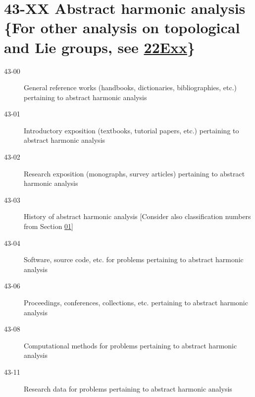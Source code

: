 \section*{43-XX Abstract harmonic analysis \{For other analysis on topological and Lie groups, see \hyperref[22Exx]{22Exx}\} }\label{43-XX}
\begin{description}
\item [43-00]\label{43-00} General reference works (handbooks, dictionaries, bibliographies, etc.) pertaining to abstract harmonic analysis
\item [43-01]\label{43-01} Introductory exposition (textbooks, tutorial papers, etc.) pertaining to abstract harmonic analysis
\item [43-02]\label{43-02} Research exposition (monographs, survey articles) pertaining to abstract harmonic analysis
\item [43-03]\label{43-03} History of abstract harmonic analysis [Consider also classification numbers from Section \hyperref[01-XX]{01}]
\item [43-04]\label{43-04} Software, source code, etc. for problems pertaining to abstract harmonic analysis
\item [43-06]\label{43-06} Proceedings, conferences, collections, etc. pertaining to abstract harmonic analysis
\item [43-08]\label{43-08} Computational methods for problems pertaining to abstract harmonic analysis
\item [43-11]\label{43-11} Research data for problems pertaining to abstract harmonic analysis
\end{description}
